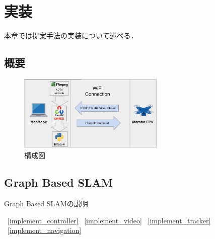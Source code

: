\chapter{実装}
\label{implementation}

本章では提案手法の実装について述べる．

\section{概要}
\begin{figure}[htbp]
  \begin{center}
    \includegraphics[clip,width=7.0cm]{img/sys-struct.png}
    \caption{構成図}
    \label{fig:struct}
  \end{center}
\end{figure}

\section{Graph Based SLAM}
\label{graph_slam}

Graph Based SLAMの説明  

~\ref{implement_controller}
~\ref{implement_video}
~\ref{implement_tracker}
~\ref{implement_navigation}







